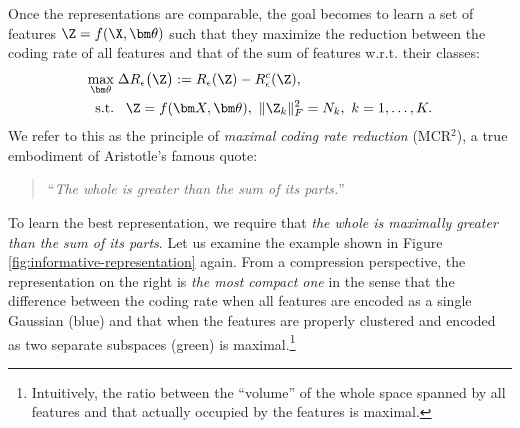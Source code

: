 \documentclass[../../book-main.tex]{subfiles}
\begin{document}
Once the representations are comparable, the goal becomes to learn a set of features $\Z  = f(\X, \bm \theta)$  such that they maximize the reduction between the coding rate of all features and that of the sum of features w.r.t. their classes:
\begin{equation}
	\begin{aligned}
		\max_{\bm \theta } & \;  \Delta R_{\epsilon}\big(\Z \big) := R_{\epsilon}(\Z) - R_{\epsilon}^c(\Z ), \\
		\mbox{s.t.} & \ \ \, \Z = f(\bm X, \bm \theta),\  \|\Z_k\|_F^2                                          = N_k,\ k=1,\dots,K. 
	\end{aligned}
	\label{eqn:maximal-rate-reduction}
\end{equation}
We refer to this as the principle of {\em maximal coding rate reduction} (MCR$^2$),
a true embodiment of Aristotle's famous quote:
\begin{quote}
	\centering
	``{\em The whole is greater than the sum of its parts.}''
\end{quote}
To learn the best representation, we require that {\em the whole is maximally greater than the sum of its parts}. Let us examine the example shown in Figure \ref{fig:informative-representation} again. From a compression perspective, the representation on the right is {\em the most compact one} in the sense that the difference between the coding rate when all features are encoded as a single Gaussian (blue) and that when the features are properly clustered and encoded as two separate subspaces (green) is maximal.\footnote{Intuitively, the ratio between the ``volume'' of the whole space spanned by all features and that actually occupied by the features is maximal.}
\end{document}

